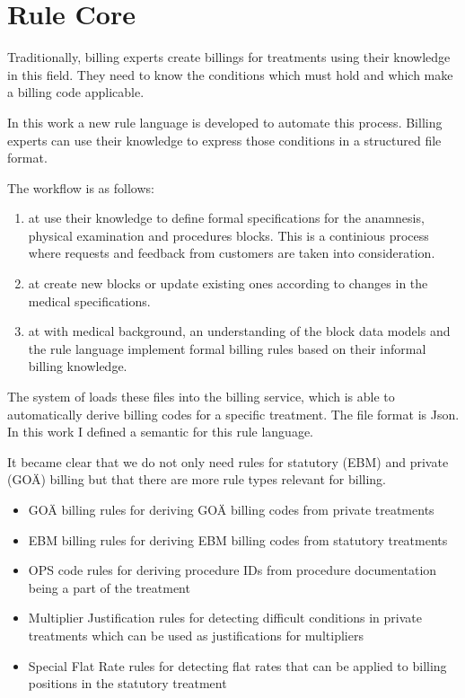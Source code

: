 \section{Rule Core}

Traditionally, billing experts create billings for treatments using their knowledge in this field.
They need to know the conditions which must hold and which make a billing code applicable.

In this work a new rule language is developed to automate this process.
Billing experts can use their knowledge to express those conditions in a structured file format.



The workflow is as follows:
\begin{enumerate}
    \item \Me at \AV use their knowledge to define formal specifications for the anamnesis, physical examination and procedures blocks. This is a continious process where requests and feedback from customers are taken into consideration.
    \item \Se at \AV create new blocks or update existing ones according to changes in the medical specifications.
    \item \Be at \AV with medical background, an understanding of the block data models and the rule language implement formal billing rules based on their informal billing knowledge.
\end{enumerate}


The system of \AV loads these files into the billing service, which is able to automatically derive billing codes for a specific treatment.
The file format is Json.
In this work I defined a semantic for this rule language.

It became clear that we do not only need rules for statutory (EBM) and private (GOÄ) billing but that there are more rule types relevant for billing.

\begin{itemize}
    \item GOÄ billing rules for deriving GOÄ billing codes from private treatments
    \item EBM billing rules for deriving EBM billing codes from statutory treatments
    \item OPS code rules for deriving procedure IDs from procedure documentation being a part of the treatment
    \item Multiplier Justification rules for detecting difficult conditions in private treatments which can be used as justifications for multipliers
    \item Special Flat Rate rules for detecting flat rates that can be applied to billing positions in the statutory treatment
\end{itemize}

